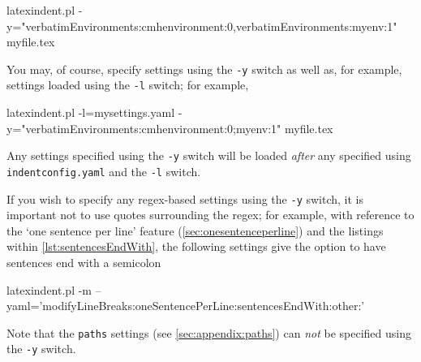   \begin{commandshell}
latexindent.pl -y="verbatimEnvironments:cmhenvironment:0,verbatimEnvironments:myenv:1" myfile.tex
\end{commandshell}

  You may, of course, specify settings using the \texttt{-y} switch as well as, for
  example, settings loaded using the \texttt{-l} switch; for example,  

  \begin{commandshell}
latexindent.pl -l=mysettings.yaml -y="verbatimEnvironments:cmhenvironment:0;myenv:1" myfile.tex
\end{commandshell}

  Any settings specified using the \texttt{-y} switch will be loaded \emph{after} any
  specified using \texttt{indentconfig.yaml} and the \texttt{-l} switch.

  If you wish to specify any regex-based settings using the \texttt{-y} switch,
   it is important not to use quotes
  surrounding the regex; for example, with reference to the `one sentence per line'
  feature (\vref{sec:onesentenceperline}) and the listings within
  \vref{lst:sentencesEndWith}, the following settings give the option to have sentences
  end with a semicolon 

  \begin{commandshell}
latexindent.pl -m --yaml='modifyLineBreaks:oneSentencePerLine:sentencesEndWith:other:\;'
\end{commandshell}

  Note that the \texttt{paths} settings (see \vref{sec:appendix:paths}) can \emph{not} be
  specified using the \texttt{-y} switch.

